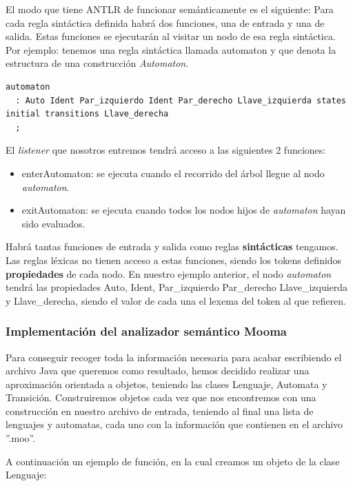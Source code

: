 \documentclass{pre-tfg}
\begin{document}
El modo que tiene ANTLR de funcionar semánticamente es el siguiente: Para cada regla sintáctica definida habrá dos funciones, una de entrada y una de salida. Estas funciones se ejecutarán al visitar un nodo de esa regla sintáctica. Por ejemplo: tenemos una regla sintáctica llamada automaton y que denota la estructura de una construcción \textit{Automaton}. 

\begin{lstlisting}[caption=Regla sintáctica automaton.]
automaton
  : Auto Ident Par_izquierdo Ident Par_derecho Llave_izquierda states initial transitions Llave_derecha
  ;
\end{lstlisting}

El \textit{listener} que nosotros entremos tendrá acceso a las siguientes 2 funciones:
\begin{itemize}
    \item enterAutomaton: se ejecuta cuando el recorrido del árbol llegue al nodo \textit{automaton}.
    \item exitAutomaton: se ejecuta cuando todos los nodos hijos de \textit{automaton} hayan sido evaluados.
\end{itemize}

Habrá tantas funciones de entrada y salida como reglas \textbf{sintácticas} tengamos. Las reglas léxicas no tienen acceso a estas funciones, siendo los tokens definidos \textbf{propiedades} de cada nodo. En nuestro ejemplo anterior, el nodo \textit{automaton} tendrá las propiedades Auto, Ident, Par\_izquierdo Par\_derecho Llave\_izquierda y Llave\_derecha, siendo el valor de cada una el lexema del token al que refieren. 

\subsubsection{Implementación del analizador semántico Mooma}

Para conseguir recoger toda la información necesaria para acabar escribiendo el archivo Java que queremos como resultado, hemos decidido realizar una aproximación orientada a objetos, teniendo las clases Lenguaje, Automata y Transición. Construiremos objetos cada vez que nos encontremos con una construcción en nuestro archivo de entrada, teniendo al final una lista de lenguajes y automatas, cada uno con la información que contienen en el archivo ''.moo''. 

A continuación un ejemplo de función, en la cual creamos un objeto de la clase Lenguaje:
\end{document}
